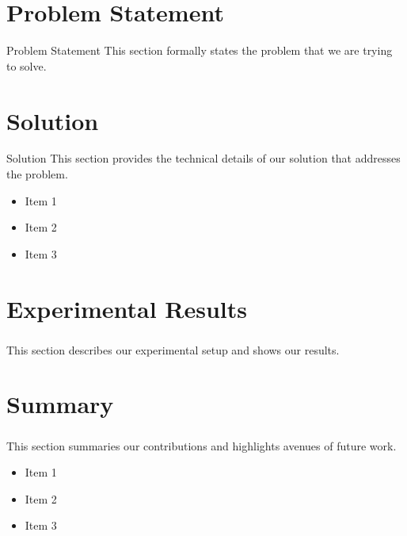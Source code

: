 \documentclass{beamer}
\begin{document}
\section{Problem Statement}
\begin{frame}
\begin{block}
{Problem Statement}
This section formally states the problem that we are trying to solve.
\end{block}
\end{frame}

\section{Solution}
\begin{frame}
\begin{block}
{Solution}
This section provides the technical details of our solution that addresses the
problem. 
\begin{itemize}
  \item Item 1 
  \item Item 2 
  \item Item 3 
\end{itemize}
\end{block}
\end{frame}

\section{Experimental Results}
\begin{frame}
\frametitle{}
This section describes our experimental setup and shows our results.
\end{frame}

\section{Summary}
\begin{frame}
\frametitle{}
This section summaries our contributions and highlights avenues of future work.
\begin{itemize}
  \item Item 1 
  \item Item 2
  \item Item 3
\end{itemize}
\end{frame}
\end{document}
